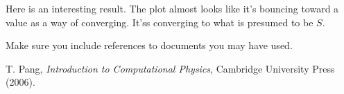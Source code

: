 \documentclass[prb,twocolumn]{revtex4-2}
\begin{document}
Here is an interesting result. The plot almost looks like it's bouncing toward a value as a way of converging. It'ss converging to what is presumed to be $S$.

Make sure you include references to documents \cite{thecoursetext} you may have used.

\begin{thebibliography}{99}

 T. Pang, \emph{Introduction to Computational Physics}, Cambridge University Press (2006).

\end{thebibliography}
\end{document}
